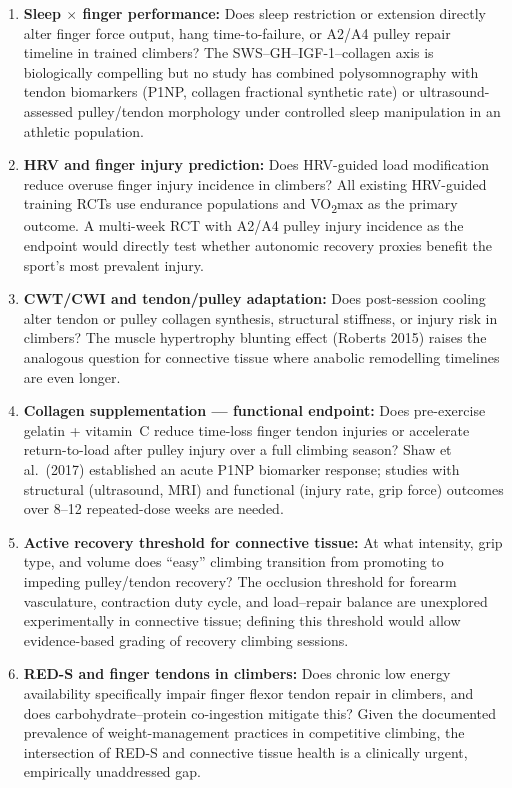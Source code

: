 \begin{enumerate}[noitemsep]
  \item \textbf{Sleep $\times$ finger performance:} Does sleep restriction or extension directly alter finger force output, hang time-to-failure, or A2/A4 pulley repair timeline in trained climbers? The SWS--GH--IGF-1--collagen axis is biologically compelling but no study has combined polysomnography with tendon biomarkers (P1NP, collagen fractional synthetic rate) or ultrasound-assessed pulley/tendon morphology under controlled sleep manipulation in an athletic population.

  \item \textbf{HRV and finger injury prediction:} Does HRV-guided load modification reduce overuse finger injury incidence in climbers? All existing HRV-guided training RCTs use endurance populations and VO\textsubscript{2}max as the primary outcome. A multi-week RCT with A2/A4 pulley injury incidence as the endpoint would directly test whether autonomic recovery proxies benefit the sport's most prevalent injury.

  \item \textbf{CWT/CWI and tendon/pulley adaptation:} Does post-session cooling alter tendon or pulley collagen synthesis, structural stiffness, or injury risk in climbers? The muscle hypertrophy blunting effect (Roberts 2015) raises the analogous question for connective tissue where anabolic remodelling timelines are even longer.

  \item \textbf{Collagen supplementation --- functional endpoint:} Does pre-exercise gelatin + vitamin~C reduce time-loss finger tendon injuries or accelerate return-to-load after pulley injury over a full climbing season? Shaw et al.\ (2017) established an acute P1NP biomarker response; studies with structural (ultrasound, MRI) and functional (injury rate, grip force) outcomes over 8--12 repeated-dose weeks are needed.

  \item \textbf{Active recovery threshold for connective tissue:} At what intensity, grip type, and volume does ``easy'' climbing transition from promoting to impeding pulley/tendon recovery? The occlusion threshold for forearm vasculature, contraction duty cycle, and load--repair balance are unexplored experimentally in connective tissue; defining this threshold would allow evidence-based grading of recovery climbing sessions.

  \item \textbf{RED-S and finger tendons in climbers:} Does chronic low energy availability specifically impair finger flexor tendon repair in climbers, and does carbohydrate--protein co-ingestion mitigate this? Given the documented prevalence of weight-management practices in competitive climbing, the intersection of RED-S and connective tissue health is a clinically urgent, empirically unaddressed gap.
\end{enumerate}
